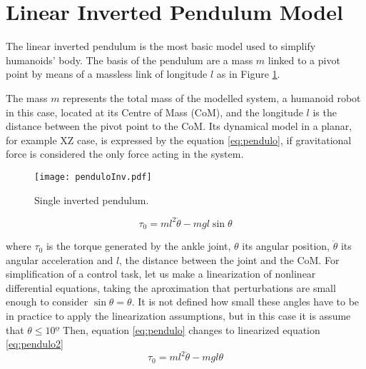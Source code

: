 \section{Linear Inverted Pendulum Model}
The linear inverted pendulum is the most basic model used to simplify humanoids' body. The basis of the pendulum are a mass $m$ linked to a pivot point by means of a massless link of longitude $l$ as in Figure \ref{fig:pendulo_inv}.

The mass $m$ represents the total mass of the modelled system, a humanoid robot in this case, located at its Centre of Mass (CoM), and the longitude $l$ is the distance between the pivot point to the CoM. Its dynamical model in a planar, for example XZ case, is expressed by the equation \eqref{eq:pendulo}, if gravitational force is considered the only force acting in the system.

\begin{figure}
\centering
\texttt{[image: penduloInv.pdf]}
\caption{Single inverted pendulum.}
\label{fig:pendulo_inv}
\end{figure}

\begin{equation}
\tau_0 = ml^2 \ddot{\theta} - mgl\sin\theta
\label{eq:pendulo}
\end{equation}

where $\tau_0$ is the torque generated by the ankle joint, $\theta$ its angular position, $\ddot{\theta}$ its angular acceleration and $l$, the distance between the joint and the CoM. For simplification of a control task, let us make a linearization of nonlinear differential equations, taking the aproximation that perturbations are small enough to consider  $\sin\theta = \theta$. It is not defined how small these angles have to be in practice to apply the linearization assumptions, but in this case it is assume that $\theta \leq 10º$ Then, equation \eqref{eq:pendulo} changes to linearized equation \eqref{eq:pendulo2}
\begin{equation}
\tau_0 = ml^2 \ddot{\theta} - mgl\theta
\label{eq:pendulo2}
\end{equation}

